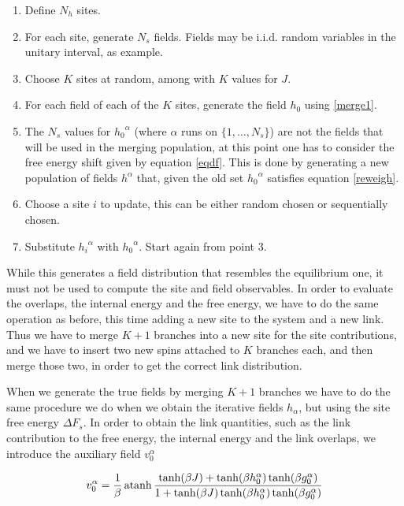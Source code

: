 \begin{enumerate}
    \item{Define $N_h$ sites.}
    \item{For each site, generate $N_s$ fields. Fields may be i.i.d. random variables in the unitary interval, as example.}
    \item{Choose $K$ sites at random, among with $K$ values for $J$.}
    \item{For each field of each of the $K$ sites, generate the field $h_0$ using \ref{merge1}.}
    \item{The $N_s$ values for ${h_0}^\alpha$ (where $\alpha$ runs on $\{1,\ldots,N_s\}$) are not the fields that will be used in the merging population, at this point one has to consider the free energy shift given by equation \ref{eqdf}. This is done by generating a new population of fields $h^\alpha$ that, given the old set ${h_0}^\alpha$ satisfies equation \ref{reweigh}. }
    \item{Choose a site $i$ to update, this can be either random chosen or sequentially chosen.}
    \item{Substitute ${h_i}^\alpha$ with ${h_0}^\alpha$. Start again from point 3.}
\end{enumerate}

While this generates a field distribution that resembles the equilibrium one, it must not be used to compute the site and field observables. In order to evaluate the overlaps, the internal energy and the free energy, we have to do the same operation as before, this time adding a new site to the system and a new link. Thus we have to merge $K+1$ branches into a new site for the site contributions, and we have to insert two new spins attached to $K$ branches each, and then merge those two, in order to get the correct link distribution.

When we generate the true fields by merging $K+1$ branches we have to do the same procedure we do when we obtain the iterative fields $h_\alpha$, but using the site free energy $\Delta F_s$. In order to obtain the link quantities, such as the link contribution to the free energy, the internal energy and the link overlaps, we introduce the auxiliary field $v_0^\alpha$

\begin{equation}
v_0^{\alpha} = {1\over\beta}\operatorname{atanh}\frac{\tanh(\beta J) + \tanh(\beta h_0^{\alpha})\tanh(\beta g_0^{\alpha})}{1+\tanh(\beta J)\tanh(\beta  h_0^{\alpha})\tanh(\beta g_0^{\alpha})}
\end{equation}

